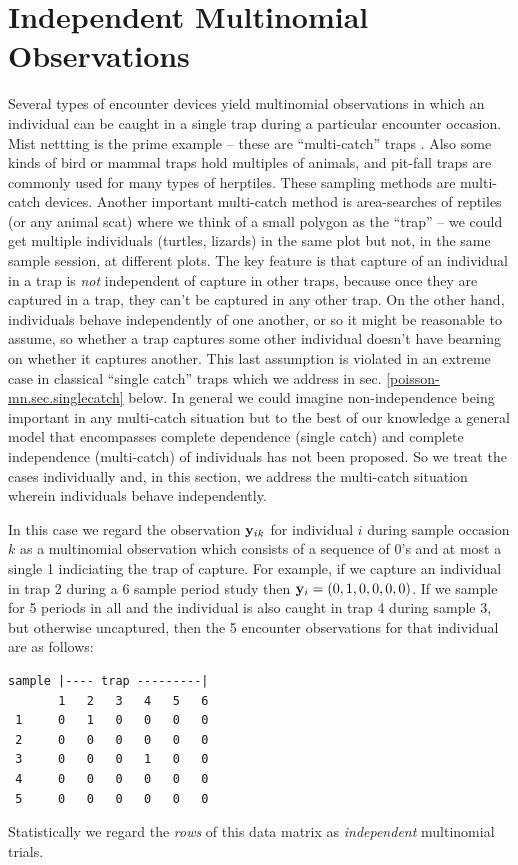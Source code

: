 \section{Independent Multinomial Observations}

Several types of encounter devices yield multinomial observations in
which an individual can be caught in a single trap during a particular
encounter occasion.  Mist nettting is the prime example -- these are
``multi-catch'' traps \citep{efford_etal:2009euring}. Also some kinds of
bird or mammal traps hold multiples of animals,
and pit-fall traps are commonly used for many types of
herptiles. These sampling methods are multi-catch devices.
Another important multi-catch method is area-searches of reptiles (or
any animal scat) where we think of
a small polygon as the ``trap'' -- we could get multiple individuals
(turtles, lizards) in the same plot but not, in the same sample
session, at different plots.  The key feature is that capture of an
individual in a trap is {\it not} independent of capture in other
traps, because once they are captured in a trap,
they can't be captured in any other trap.
On the
other hand, individuals behave independently of one another, or so it
might be reasonable to assume, so whether a trap captures some other
individual doesn't have bearning on whether it captures another.  This
last assumption is violated in an extreme case in classical ``single
catch'' traps which we address in sec. \ref{poisson-mn.sec.singlecatch}
below. In general we could imagine non-independence being important in
any multi-catch situation but to the best of our knowledge a general
model that encompasses complete dependence (single catch) and complete
independence (multi-catch) of individuals has not been proposed.  So
we treat the cases individually and, in this section, we address the
multi-catch situation wherein individuals behave independently.


In this case we regard the observation ${\bf y}_{ik}$ for
individual $i$ during sample occasion $k$ as a multinomial observation
which consists of a sequence of 0's and at most a single 1 indiciating
the trap of capture. For example, if we capture an individual in trap
2 during a 6 sample period study then ${\bf y}_{i} = (0,1,0,0,0,0)$.
If we sample for 5 periods in all and the individual is also caught
in trap 4 during sample 3, but otherwise uncaptured, then the 5 encounter observations for that
individual are as follows:
\begin{verbatim}
sample |---- trap ---------|
       1   2   3   4   5   6
 1     0   1   0   0   0   0
 2     0   0   0   0   0   0
 3     0   0   0   1   0   0
 4     0   0   0   0   0   0
 5     0   0   0   0   0   0
\end{verbatim}
Statistically we regard the {\it rows} of this data matrix as {\it
  independent} multinomial trials.


